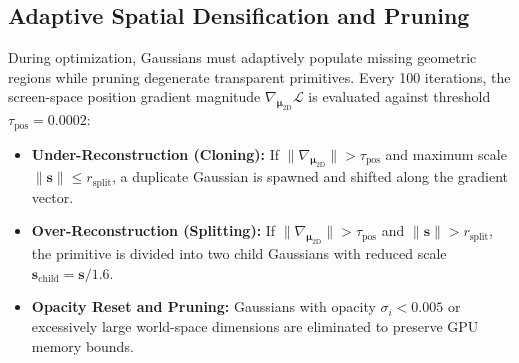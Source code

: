 \documentclass[conference]{IEEEtran}
\begin{document}
\subsection{Adaptive Spatial Densification and Pruning}
During optimization, Gaussians must adaptively populate missing geometric regions while pruning degenerate transparent primitives. Every 100 iterations, the screen-space position gradient magnitude $\nabla_{\boldsymbol{\mu}_{2\text{D}}} \mathcal{L}$ is evaluated against threshold $\tau_{\text{pos}} = 0.0002$:
\begin{itemize}
    \item \textbf{Under-Reconstruction (Cloning):} If $\|\nabla_{\boldsymbol{\mu}_{2\text{D}}}\| > \tau_{\text{pos}}$ and maximum scale $\|\mathbf{s}\| \le r_{\text{split}}$, a duplicate Gaussian is spawned and shifted along the gradient vector.
    \item \textbf{Over-Reconstruction (Splitting):} If $\|\nabla_{\boldsymbol{\mu}_{2\text{D}}}\| > \tau_{\text{pos}}$ and $\|\mathbf{s}\| > r_{\text{split}}$, the primitive is divided into two child Gaussians with reduced scale $\mathbf{s}_{\text{child}} = \mathbf{s} / 1.6$.
    \item \textbf{Opacity Reset and Pruning:} Gaussians with opacity $\sigma_i < 0.005$ or excessively large world-space dimensions are eliminated to preserve GPU memory bounds.
\end{itemize}
\end{document}
